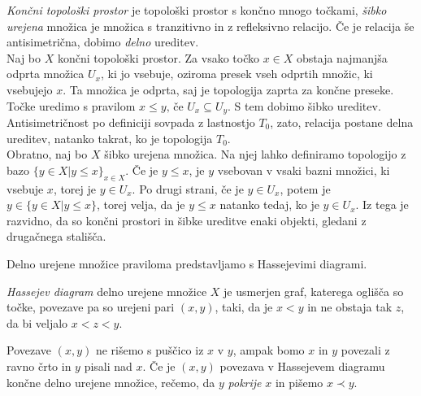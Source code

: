 \documentclass[mat1]{fmfdelo}
\begin{document}
\textit{Končni topološki prostor} je topološki prostor s končno mnogo točkami, 
\textit{šibko urejena} množica je množica s tranzitivno in z refleksivno relacijo. Če je relacija še antisimetrična, dobimo \textit{delno} ureditev.
\\ \indent Naj bo $X$ končni topološki prostor. Za vsako točko $x \in X$ obstaja najmanjša odprta množica $U_x$, ki jo
vsebuje, oziroma presek vseh odprtih množic, ki vsebujejo $x$. Ta množica je odprta, saj je topologija zaprta za končne preseke.
    Točke uredimo s pravilom $ x\le y \text{, če } U_x \subseteq  U_y$. S tem dobimo šibko ureditev. 
    Antisimetričnost po definiciji sovpada z lastnostjo $T_0$, zato, relacija postane delna ureditev,
     natanko takrat, ko je topologija $T_0$.
    \\ \indent Obratno, naj bo $X$ šibko urejena množica. Na njej lahko definiramo topologijo z bazo $\{y \in X | y\le x\}_{x \in X}$. Če je
$y \le x$, je $y$ vsebovan v vsaki bazni množici, ki vsebuje $x$, torej je $y \in U_x$. Po drugi strani, če je $y\in
U_x$, potem je $y \in \{y \in X | y \le x\}$, torej velja, da je $y \le x$ natanko tedaj, ko je $y \in U_x$. Iz tega je razvidno, da so končni prostori in šibke ureditve enaki objekti, gledani z drugačnega stališča.


Delno urejene množice praviloma predstavljamo s Hassejevimi diagrami.

\begin{definicija}
    \textit{Hassejev diagram} delno urejene množice $X$ je usmerjen graf, katerega oglišča so točke, povezave pa so urejeni pari $(x,y)$, taki, da je  $x<y$ in ne obstaja tak $z$, da bi veljalo $x<z<y$.
\end{definicija}

Povezave $(x,y)$ ne rišemo s puščico iz $x$ v $y$, ampak bomo $x$ in $y$ povezali z ravno črto in $y$ pisali nad $x$. Če je $(x,y)$ povezava v Hassejevem diagramu končne delno urejene množice, rečemo, da $y$ \textit{pokrije} $x$ in pišemo $x\prec y$.
\end{document}
